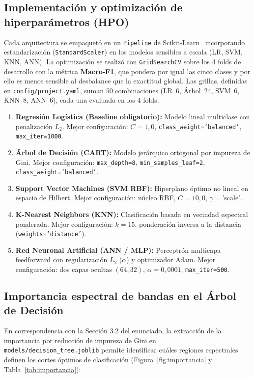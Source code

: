 \documentclass[11pt,a4paper]{article}
\begin{document}
\subsection{Implementación y optimización de hiperparámetros (HPO)}
Cada arquitectura se empaquetó en un \texttt{Pipeline} de Scikit-Learn~\cite{pedregosa2011} incorporando estandarización (\texttt{StandardScaler}) en los modelos sensibles a escala (LR, SVM, KNN, ANN). La optimización se realizó con \texttt{GridSearchCV} sobre los 4 folds de desarrollo con la métrica \textbf{Macro-F1}, que pondera por igual las cinco clases y por ello es menos sensible al desbalance que la exactitud global. Las grillas, definidas en \texttt{config/project.yaml}, suman 50 combinaciones (LR~6, Árbol~24, SVM~6, KNN~8, ANN~6), cada una evaluada en los 4 folds:
\begin{enumerate}[noitemsep,topsep=2pt]
    \item \textbf{Regresión Logística (Baseline obligatorio):} Modelo lineal multiclase con penalización $L_2$. Mejor configuración: $C = 1,0$, \texttt{class\_weight='balanced'}, \texttt{max\_iter=1000}.
    \item \textbf{Árbol de Decisión (CART):} Modelo jerárquico ortogonal por impureza de Gini. Mejor configuración: \texttt{max\_depth=8}, \texttt{min\_samples\_leaf=2}, \texttt{class\_weight='balanced'}.
    \item \textbf{Support Vector Machines (SVM RBF):} Hiperplano óptimo no lineal en espacio de Hilbert. Mejor configuración: núcleo RBF, $C = 10,0$, $\gamma = \text{'scale'}$.
    \item \textbf{K-Nearest Neighbors (KNN):} Clasificación basada en vecindad espectral ponderada. Mejor configuración: $k = 15$, ponderación inversa a la distancia (\texttt{weights='distance'}).
    \item \textbf{Red Neuronal Artificial (ANN / MLP):} Perceptrón multicapa feedforward con regularización $L_2$ ($\alpha$) y optimizador Adam. Mejor configuración: dos capas ocultas $(64, 32)$, $\alpha = 0,0001$, \texttt{max\_iter=500}.
\end{enumerate}

\subsection{Importancia espectral de bandas en el Árbol de Decisión}
En correspondencia con la Sección 3.2 del enunciado, la extracción de la importancia por reducción de impureza de Gini en \texttt{models/decision\_tree.joblib} permite identificar cuáles regiones espectrales definen los cortes óptimos de clasificación (Figura~\ref{fig:importancia} y Tabla~\ref{tab:importancia}):
\end{document}
